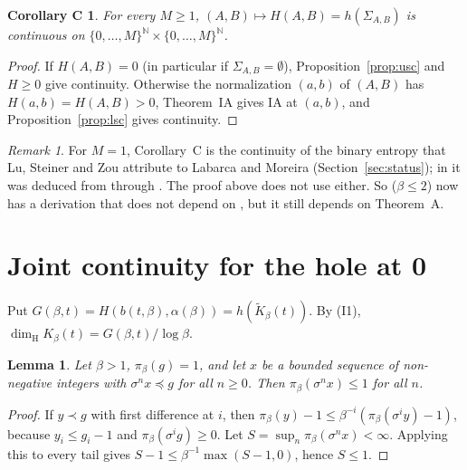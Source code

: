 \documentclass[11pt]{amsart}
\newtheorem{lemma}[theorem]{Lemma}
\newtheorem*{corC}{Corollary C}
\theoremstyle{definition}
\theoremstyle{remark}
\newtheorem{remark}[theorem]{Remark}
\newcommand{\N}{\mathbb{N}}
\newcommand{\dimH}{\dim_{\mathrm H}}
\newcommand{\lex}{\preccurlyeq}
\newcommand{\K}{\tilde K}
\begin{document}
\begin{corC}
For every $M\ge1$, $(A,B)\mapsto H(A,B)=h(\Sigma_{A,B})$ is continuous on $\{0,\dots,M\}^{\N}\times\{0,\dots,M\}^{\N}$.
\end{corC}

\begin{proof}
If $H(A,B)=0$ (in particular if $\Sigma_{A,B}=\emptyset$), Proposition~\ref{prop:usc} and $H\ge0$ give continuity. Otherwise the normalization $(a,b)$ of $(A,B)$ has $H(a,b)=H(A,B)>0$, Theorem~IA gives IA at $(a,b)$, and Proposition~\ref{prop:lsc} gives continuity.
\end{proof}

\begin{remark}
For $M=1$, Corollary~C is the continuity of the binary entropy that Lu, Steiner and Zou attribute to Labarca and Moreira (Section~\ref{sec:status}); in \cite{Nem26} it was deduced from \cite[Theorem~1.4]{LSZ} through \cite[Theorem~2.6]{KSZ}. The proof above does not use either. So \cite[Theorem~E]{Nem26} ($\beta\le2$) now has a derivation that does not depend on \cite[Theorem~1.4]{LSZ}, but it still depends on Theorem~A.
\end{remark}

\section{Joint continuity for the hole at 0}\label{sec:hole}

Put $G(\beta,t)=H(b(t,\beta),\alpha(\beta))=h(\K_\beta(t))$. By (I1), $\dimH K_\beta(t)=G(\beta,t)/\log\beta$.

\begin{lemma}\label{lem:tails}
Let $\beta>1$, $\pi_\beta(g)=1$, and let $x$ be a bounded sequence of non-negative integers with $\sigma^nx\lex g$ for all $n\ge0$. Then $\pi_\beta(\sigma^nx)\le1$ for all $n$.
\end{lemma}

\begin{proof}
If $y\prec g$ with first difference at $i$, then $\pi_\beta(y)-1\le\beta^{-i}(\pi_\beta(\sigma^iy)-1)$, because $y_i\le g_i-1$ and $\pi_\beta(\sigma^ig)\ge0$. Let $S=\sup_n\pi_\beta(\sigma^nx)<\infty$. Applying this to every tail gives $S-1\le\beta^{-1}\max(S-1,0)$, hence $S\le1$.
\end{proof}
\end{document}
